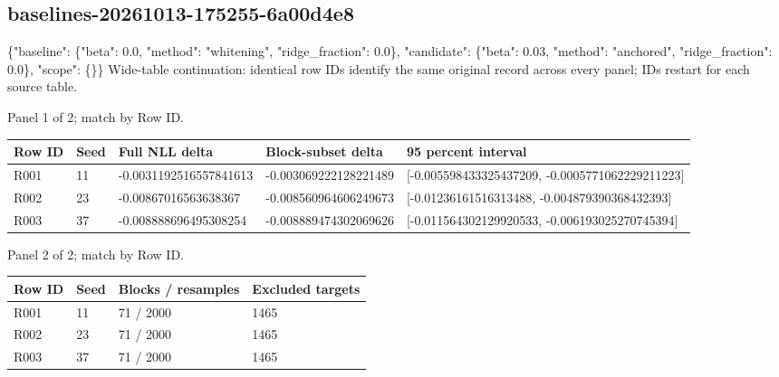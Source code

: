 \documentclass[10pt]{article}
\begin{document}
\subsection{baselines-20261013-175255-6a00d4e8}
\{"baseline": \{"beta": 0.0, "method": "whitening", "ridge\_fraction": 0.0\}, "candidate": \{"beta": 0.03, "method": "anchored", "ridge\_fraction": 0.0\}, "scope": \{\}\}
Wide-table continuation: identical row IDs identify the same original record across every panel; IDs restart for each source table.
\par\noindent Panel 1 of 2; match by Row ID.
{\scriptsize\setlength{\tabcolsep}{2pt}
\begin{longtable}{p{}p{}p{}p{}p{}}
Row ID & Seed & Full NLL delta & Block-subset delta & 95 percent interval \\
\hline\endhead
R001 & 11 & -0.0031192516557841613 & -0.003069222128221489 & [-0.005598433325437209, -0.0005771062229211223] \\
R002 & 23 & -0.00867016563638367 & -0.008560964606249673 & [-0.01236161516313488, -0.004879390368432393] \\
R003 & 37 & -0.008888696495308254 & -0.008889474302069626 & [-0.011564302129920533, -0.006193025270745394] \\
\end{longtable}}
\par\noindent Panel 2 of 2; match by Row ID.
{\scriptsize\setlength{\tabcolsep}{2pt}
\begin{longtable}{p{}p{}p{}p{}}
Row ID & Seed & Blocks / resamples & Excluded targets \\
\hline\endhead
R001 & 11 & 71 / 2000 & 1465 \\
R002 & 23 & 71 / 2000 & 1465 \\
R003 & 37 & 71 / 2000 & 1465 \\
\end{longtable}}
\end{document}
